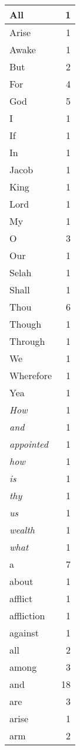 \begin{center}
\begin{longtable}{l|r}
\hline \hline
\endlastfoot
All & 1 \\ \hline
Arise & 1 \\ \hline
Awake & 1 \\ \hline
But & 2 \\ \hline
For & 4 \\ \hline
God & 5 \\ \hline
I & 1 \\ \hline
If & 1 \\ \hline
In & 1 \\ \hline
Jacob & 1 \\ \hline
King & 1 \\ \hline
Lord & 1 \\ \hline
My & 1 \\ \hline
O & 3 \\ \hline
Our & 1 \\ \hline
Selah & 1 \\ \hline
Shall & 1 \\ \hline
Thou & 6 \\ \hline
Though & 1 \\ \hline
Through & 1 \\ \hline
We & 1 \\ \hline
Wherefore & 1 \\ \hline
Yea & 1 \\ \hline
\emph{How} & 1 \\ \hline
\emph{and} & 1 \\ \hline
\emph{appointed} & 1 \\ \hline
\emph{how} & 1 \\ \hline
\emph{is} & 1 \\ \hline
\emph{thy} & 1 \\ \hline
\emph{us} & 1 \\ \hline
\emph{wealth} & 1 \\ \hline
\emph{what} & 1 \\ \hline
a & 7 \\ \hline
about & 1 \\ \hline
afflict & 1 \\ \hline
affliction & 1 \\ \hline
against & 1 \\ \hline
all & 2 \\ \hline
among & 3 \\ \hline
and & 18 \\ \hline
are & 3 \\ \hline
arise & 1 \\ \hline
arm & 2 \\ \hline

\end{longtable}
\end{center}
